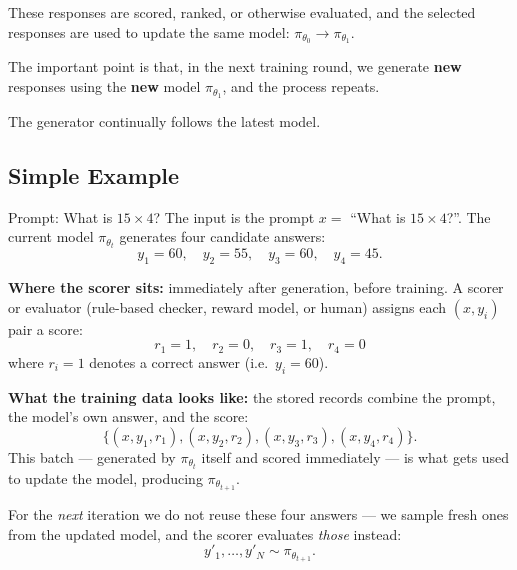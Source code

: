 \documentclass[11pt]{article}
\begin{document}
These responses are scored, ranked, or otherwise evaluated, and the selected responses are used to update the same model: $\pi_{\theta_0} \rightarrow \pi_{\theta_1}$.

The important point is that, in the next training round, we generate \textbf{new} responses using the \textbf{new} model $\pi_{\theta_1}$, and the process repeats.

\begin{center}
\end{center}

The generator continually follows the latest model.

\subsection*{Simple Example}

\begin{stepbox}{Prompt: What is $15 \times 4$?}
The input is the prompt $x = $ ``What is $15\times 4$?''. The current model $\pi_{\theta_t}$ generates four candidate answers:
\[
y_1 = 60,\quad y_2 = 55,\quad y_3 = 60,\quad y_4 = 45.
\]

\textbf{Where the scorer sits:} immediately after generation, before training. A scorer or evaluator (rule-based checker, reward model, or human) assigns each $(x, y_i)$ pair a score:
\[
r_1 = 1,\quad r_2 = 0,\quad r_3 = 1,\quad r_4 = 0
\]
where $r_i = 1$ denotes a correct answer (i.e.\ $y_i = 60$).

\textbf{What the training data looks like:} the stored records combine the prompt, the model's own answer, and the score:
\[
\{(x, y_1, r_1), (x, y_2, r_2), (x, y_3, r_3), (x, y_4, r_4)\}.
\]
This batch — generated by $\pi_{\theta_t}$ itself and scored immediately — is what gets used to update the model, producing $\pi_{\theta_{t+1}}$.

For the \emph{next} iteration we do not reuse these four answers — we sample fresh ones from the updated model, and the scorer evaluates \emph{those} instead:
\[
y'_1,\ldots,y'_N \sim \pi_{\theta_{t+1}}.
\]
\end{stepbox}
\end{document}

